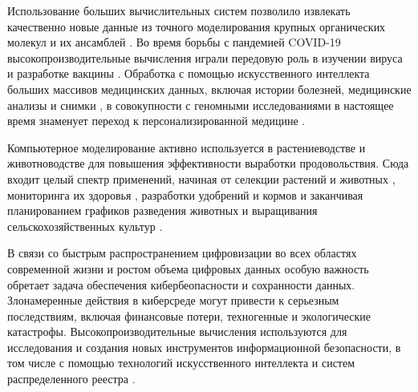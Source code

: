 Использование больших вычислительных систем позволило извлекать качественно новые данные из точного моделирования крупных органических молекул и их ансамблей \cite{Teplukhin2009SuperBigMolec}.
Во время борьбы с пандемией COVID-19\label{abbr:covid-1} высокопроизводительные вычисления играли передовую роль в изучении вируса и разработке вакцины \cite{Colonnelli2021SuperCovid}.
Обработка с помощью искусственного интеллекта больших массивов медицинских данных, включая истории болезней, медицинские анализы и снимки \cite{Ri2024SuperXRay}, в совокупности с геномными исследованиями в настоящее время знаменует переход к персонализированной медицине \cite{Kishore2024SuperPrecMed}.

Компьютерное моделирование активно используется в растениеводстве и животноводстве для повышения эффективности выработки продовольствия.
Сюда входит целый спектр применений, начиная от селекции растений и животных \cite{Ahmetshina2020SuperSelection}, мониторинга их здоровья \cite{Mourant2018SuperEpi}, разработки удобрений и кормов \cite{Irfan2016SuperFert} и заканчивая планированием графиков разведения животных и выращивания сельскохозяйственных культур \cite{Zhang2021SuperFertPlan}.

В связи со быстрым распространением цифровизации во всех областях современной жизни и ростом объема цифровых данных особую важность обретает задача обеспечения кибербеопасности и сохранности данных.
Злонамеренные действия в киберсреде могут привести к серьезным последствиям, включая финансовые потери, техногенные и экологические катастрофы.
Высокопроизводительные вычисления используются для исследования и создания новых инструментов информационной безопасности, в том числе с помощью технологий искусственного интеллекта и систем распределенного реестра \cite{Terziyska2024SuperCyber}.

